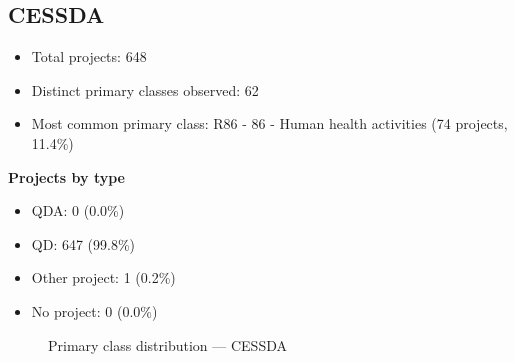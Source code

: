 \subsection{CESSDA}

\begin{itemize}
    \item Total projects: 648
    \item Distinct primary classes observed: 62
    \item Most common primary class: R86 - 86 - Human health activities (74 projects, 11.4\%)
\end{itemize}
\textbf{Projects by type}
\begin{itemize}
    \item QDA: 0 (0.0\%)
    \item QD: 647 (99.8\%)
    \item Other project: 1 (0.2\%)
    \item No project: 0 (0.0\%)
\end{itemize}

\begin{figure}[H]
    \centering
    
    \caption{Primary class distribution --- CESSDA}
\end{figure}

